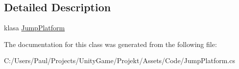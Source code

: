 \subsection{Detailed Description}
klasa \hyperlink{class_jump_platform}{Jump\+Platform} 



The documentation for this class was generated from the following file\+:\begin{DoxyCompactItemize}
\item 
C\+:/\+Users/\+Paul/\+Projects/\+Unity\+Game/\+Projekt/\+Assets/\+Code/Jump\+Platform.\+cs\end{DoxyCompactItemize}
